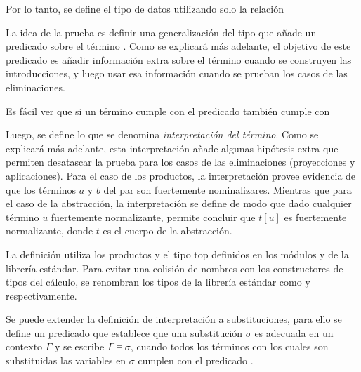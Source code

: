 Por lo tanto, se define el tipo de datos  utilizando solo la relación \type{$\_\hookrightarrow\_$}


La idea de la prueba es definir una generalización del tipo  que añade un predicado sobre el término .
Como se explicará más adelante, el objetivo de este predicado es añadir información extra sobre el término cuando se construyen las introducciones, y luego usar esa información cuando se prueban los casos de las eliminaciones.


Es fácil ver que si un término cumple con el predicado  también cumple con 


Luego, se define lo que se denomina \textit{interpretación del término}.
Como se explicará más adelante, esta interpretación añade algunas hipótesis extra que permiten desatascar la prueba para los casos de las eliminaciones (proyecciones y aplicaciones).
Para el caso de los productos, la interpretación provee evidencia de que los términos $a$ y $b$ del par son fuertemente nominalizares.
Mientras que para el caso de la abstracción, la interpretación se define de modo que dado cualquier término $u$ fuertemente normalizante, permite concluir que $t [u]$ es fuertemente normalizante, donde $t$ es el cuerpo de la abstracción.


La definición utiliza los productos \func{$\_\times\_$} y el tipo top \type{$\top$} definidos en los módulos  y  de la librería estándar.
Para evitar una colisión de nombres con los constructores de tipos del cálculo, se renombran los tipos de la librería estándar como \func{$\_\otimes\_$} y  respectivamente.

Se puede extender la definición de interpretación a substituciones, para ello se define un predicado que establece que una substitución $\sigma$ es adecuada en un contexto $\Gamma$ y se escribe $\Gamma \vDash \sigma$, cuando todos los términos con los cuales son substituidas las variables en $\sigma$ cumplen con el predicado \snstar.


